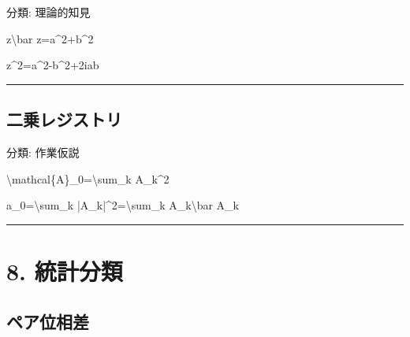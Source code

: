 \documentclass[
  a4paper,
]{ltjsarticle}
\newenvironment{Shaded}{}{}
\newcommand{\NormalTok}[1]{#1}
\begin{document}
分類: 理論的知見

\begin{Shaded}
\begin{Highlighting}[]
\NormalTok{z\textbackslash{}bar z=a\^{}2+b\^{}2}
\end{Highlighting}
\end{Shaded}

\begin{Shaded}
\begin{Highlighting}[]
\NormalTok{z\^{}2=a\^{}2{-}b\^{}2+2iab}
\end{Highlighting}
\end{Shaded}

\begin{center}\rule{0.5\linewidth}{0.5pt}\end{center}

\subsection{二乗レジストリ}\label{ux4e8cux4e57ux30ecux30b8ux30b9ux30c8ux30ea}

分類: 作業仮説

\begin{Shaded}
\begin{Highlighting}[]
\NormalTok{\textbackslash{}mathcal\{A\}\_0=\textbackslash{}sum\_k A\_k\^{}2}
\end{Highlighting}
\end{Shaded}

\begin{Shaded}
\begin{Highlighting}[]
\NormalTok{a\_0=\textbackslash{}sum\_k |A\_k|\^{}2=\textbackslash{}sum\_k A\_k\textbackslash{}bar A\_k}
\end{Highlighting}
\end{Shaded}

\begin{center}\rule{0.5\linewidth}{0.5pt}\end{center}

\section{8. 統計分類}\label{ux7d71ux8a08ux5206ux985e}

\subsection{ペア位相差}\label{ux30daux30a2ux4f4dux76f8ux5dee}
\end{document}
